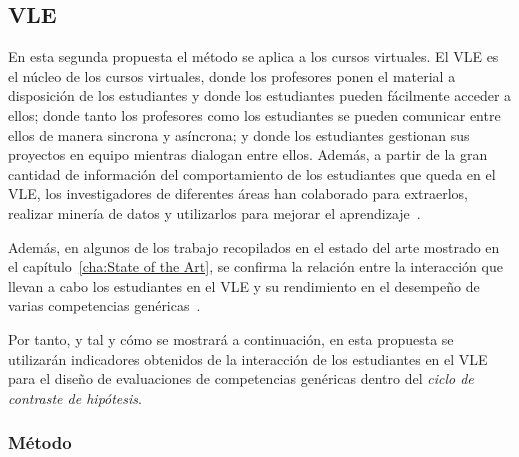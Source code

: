


\subsection{VLE}

En esta segunda propuesta el método se aplica a los cursos virtuales. El VLE es el núcleo de los cursos virtuales, donde los profesores ponen el material a disposición de los estudiantes y donde los estudiantes pueden fácilmente acceder a ellos; donde tanto los profesores como los estudiantes se pueden comunicar entre ellos de manera sincrona y asíncrona; y donde los estudiantes gestionan sus proyectos en equipo mientras dialogan entre ellos. Además, a partir de la gran cantidad de información del comportamiento de los estudiantes que queda en el VLE, los investigadores de diferentes áreas han colaborado para extraerlos, realizar minería de datos y utilizarlos para mejorar el aprendizaje~\cite{park2015development}.

Además, en algunos de los trabajo recopilados en el estado del arte mostrado en el capítulo~\ref{cha:State of the Art}, se confirma la relación entre la interacción que llevan a cabo los estudiantes en el VLE y su rendimiento en el desempeño de varias competencias genéricas~\cite{fidalgo:2015,rayon2014web}. 

Por tanto, y tal y cómo se mostrará a continuación, en esta propuesta se utilizarán indicadores obtenidos de la interacción de los estudiantes en el VLE para el diseño de evaluaciones de competencias genéricas dentro del  \emph{ciclo de contraste de hipótesis}.

\subsubsection{Método}

